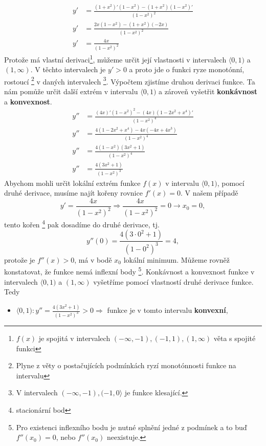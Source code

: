 \begin{example}
\begin{enumerate}
               \begin{align*}
                 y' &= \frac{(1+x^2)'(1-x^2 )-(1+x^2)(1-x^2 )'}{(1-x^2)^2} \\
                 y' &= \frac{2x(1-x^2 )-(1+x^2 )(-2x)}{(1-x^2 )^2}         \\
                 y' &= \frac{4x}{(1-x^2 )^2}
               \end{align*}
               Protože má vlastní derivaci\footnote{$f(x)$ je spojitá v intervalech $(-\infty,-1),(-1,1),(1,\infty)$ věta s spojité funkci}, můžeme určit její 
               vlastnosti v intervalech $\langle0,1)$ a $(1,\infty)$. V těchto intervalech je $y'>0$ a proto jde o funkci ryze monotónní, rostoucí \footnote{Plyne z 
               věty o postačujících podmínkách ryzí monotónnosti funkce na intervalu} v daných intervalech \footnote{V intervalech $(-\infty,-1),(-1,0\rangle$ je 
               funkce klesající.}. Výpočtem zjistíme druhou derivaci funkce. Ta nám pomůže určit další extrém v intervalu $\langle0,1)$ a zároveň vyšetřit 
               \textbf{konkávnost} a \textbf{konvexnost}.
               \begin{align*}
                 y'' &= \frac{(4x)' (1-x^2 )^2-(4x)(1-2x^2+x^4 )'}{(1-x^2 )^4}  \\
                 y'' &= \frac{4(1-2x^2+x^4 )-4x(-4x+4x^3 )}{(1-x^2 )^4}         \\
                 y'' &= \frac{4(1-x^2 )(3x^2+1)}{(1-x^2 )^4}                    \\
                 y'' &= \frac{4(3x^2+1)}{(1-x^2 )^3}
               \end{align*}
             Abychom mohli určit lokální extrém funkce $f(x)$ v intervalu $\langle0,1)$, pomocí druhé derivace, musíme najít kořeny rovnice $f' (x)=0$. V našem 
             případě $$y'=\frac{4x}{(1-x^2 )^2}\Rightarrow\frac{4x}{(1-x^2 )^2}=0\rightarrow x_0=0,$$ tento kořen \footnote{stacionární bod}  pak dosadíme do druhé 
             derivace, tj. $$y''(0)=\frac{4(3\cdot0^2+1)}{(1-0^2 )^3} =4,$$ protože je $f''(x)>0$, má v bodě $x_0$ lokální minimum. Můžeme rovněž konstatovat, že 
             funkce nemá inflexní body \footnote{Pro existenci inflexního bodu je nutné splnění jedné z podmínek a to buď $f''(x_0)=0$, nebo $f''(x_0)$ neexistuje.}. 
             Konkávnost a konvexnost funkce v intervalech $\langle0,1)$ a $(1,\infty)$ vyšetříme pomocí vlastností druhé derivace funkce. Tedy
             \begin{itemize}
               \item $\langle0,1): y''=\frac{4(3x^2+1)}{(1-x^2 )^3} >0 \Rightarrow$ funkce je v tomto intervalu \textbf{konvexní},

\end{itemize}
\end{enumerate}
\end{example}
